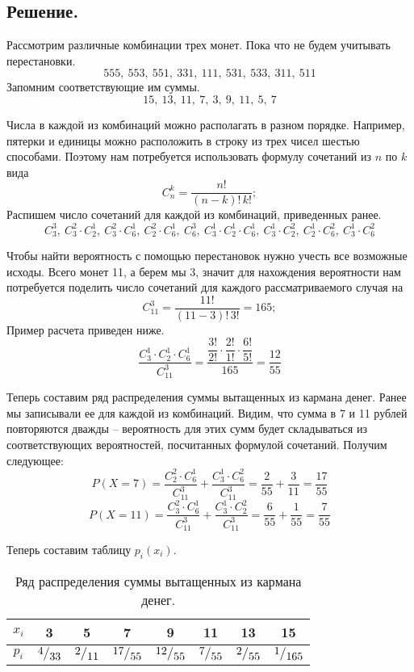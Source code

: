 \documentclass[a4paper, 12pt]{article}
\newcommand{\frc}[2]{\raisebox{2pt}{$#1$}\big/\raisebox{-3pt}{$#2$}}
\begin{document}
    \subsection{Решение.}
    Рассмотрим различные комбинации трех монет. Пока что не будем учитывать перестановки.
    $$
    555,\ 553,\ 551,\ 331,\ 111,\ 531,\ 533,\ 311,\ 511
    $$
    Запомним соответствующие им суммы.
    $$
    15,\ 13,\ 11,\ 7,\ 3,\ 9,\ 11,\ 5,\ 7
    $$


    Числа в каждой из комбинаций можно располагать в разном порядке. Например, пятерки
    и единицы можно расположить в строку из трех чисел шестью способами. Поэтому нам
    потребуется использовать формулу сочетаний из $n$ по $k$ вида
    $$
    C_n^k=\dfrac{n!}{(n-k)!\,k!};
    $$
    Распишем число сочетаний для каждой из комбинаций, приведенных ранее.
    $$
    C_3^3,\ C_3^2\cdot C_2^1,\ C_3^2\cdot C_6^1,\ C_2^2\cdot C_6^1,\ C_6^3,\ C_3^1\cdot C_2^1\cdot C_6^1,\ C_3^1\cdot C_2^2,\ C_2^1\cdot C_6^2,\ C_3^1\cdot C_6^2
    $$


    Чтобы найти вероятность с помощью перестановок нужно учесть все возможные исходы. Всего монет 11,
    а берем мы 3, значит для нахождения вероятности нам потребуется поделить число сочетаний для каждого
    рассматриваемого случая на
    $$
    C_{11}^3=\dfrac{11!}{(11-3)!\,3!}=165;
    $$
    Пример расчета приведен ниже.
    $$
    \dfrac{C_3^1\cdot C_2^1\cdot C_6^1}{C_{11}^3}=\dfrac{\dfrac{3!}{2!}\cdot\dfrac{2!}{1!}\cdot\dfrac{6!}{5!}}{165}=\dfrac{12}{55}
    $$


    Теперь составим ряд распределения суммы вытащенных из кармана денег.
    Ранее мы записывали ее для каждой из комбинаций. Видим, что сумма в 7 и 11 рублей повторяются дважды --
    вероятность для этих сумм будет складываться из соответствующих вероятностей, посчитанных формулой сочетаний.
    Получим следующее:
    $$
    P(X=7)=\dfrac{C_2^2\cdot C_6^1}{C_{11}^3}+\dfrac{C_3^1\cdot C_6^2}{C_{11}^3}=\dfrac{2}{55}+\dfrac{3}{11}=\dfrac{17}{55}
    $$
    $$
    P(X=11)=\dfrac{C_3^2\cdot C_6^1}{C_{11}^3}+\dfrac{C_3^1\cdot C_2^2}{C_{11}^3}=\dfrac{6}{55}+\dfrac{1}{55}=\dfrac{7}{55}
    $$


    \newpage
    Теперь составим таблицу $p_i(x_i)$.
    \begin{table}[h]
        \centering
        \begin{tabular}{|c|c|c|c|c|c|c|c|}
        \hline
        $x_i$ & 3 & 5 & 7 & 9 & 11 & 13 & 15 \\
        \hline
        $p_i$ & $\frc{4}{33}$ & $\frc{2}{11}$ & $\frc{17}{55}$ & $\frc{12}{55}$ & $\frc{7}{55}$ & $\frc{2}{55}$ & $\frc{1}{165}$ \\
        \hline
        \end{tabular}
        \caption{Ряд распределения суммы вытащенных из кармана денег.}
        \label{tab:moneysum}
    \end{table}
\end{document}
